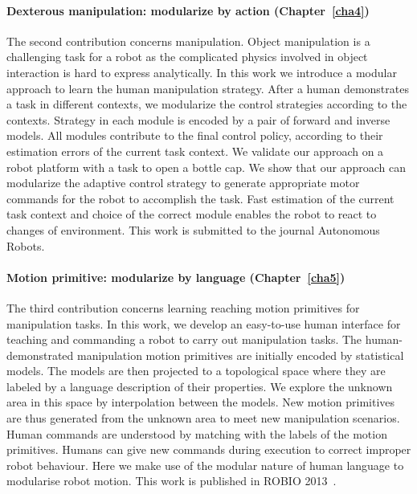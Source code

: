 \paragraph{Dexterous manipulation: modularize by action (Chapter~\ref{cha4})}
The second contribution concerns manipulation. Object manipulation is a challenging task for a robot as the complicated physics involved in object interaction is hard to express analytically. In this work we introduce a modular approach to learn the human manipulation strategy. After a human demonstrates a task in different contexts, we modularize the control strategies according to the contexts. Strategy in each module is encoded by a pair of forward and inverse models. All modules contribute to the final control policy, according to their estimation errors of the current task context. We validate our approach on a robot platform with a task to open a bottle cap. We show that our approach can modularize the adaptive control strategy to generate appropriate motor commands for the robot to accomplish the task. Fast estimation of the current task context and choice of the correct module enables the robot to react to changes of environment. This work is submitted to the journal Autonomous Robots.


\paragraph{Motion primitive: modularize by language (Chapter~\ref{cha5})}
The third contribution concerns learning reaching motion primitives for manipulation tasks. In this work, we develop an easy-to-use human interface for teaching and commanding a robot to carry out manipulation tasks. The human-demonstrated manipulation motion primitives are initially encoded by statistical models. The models are then projected to a topological space where they are labeled by a language description of their properties. We explore the unknown area in this space by interpolation between the models. New motion primitives are thus generated from the unknown area to meet new manipulation scenarios.
Human commands are understood by matching with the labels of the motion primitives. Humans can give new commands during execution to correct improper robot behaviour. Here we make use of the modular nature of human language to modularise robot motion. This work is published in ROBIO 2013~\citep{bidan2013robio}.


